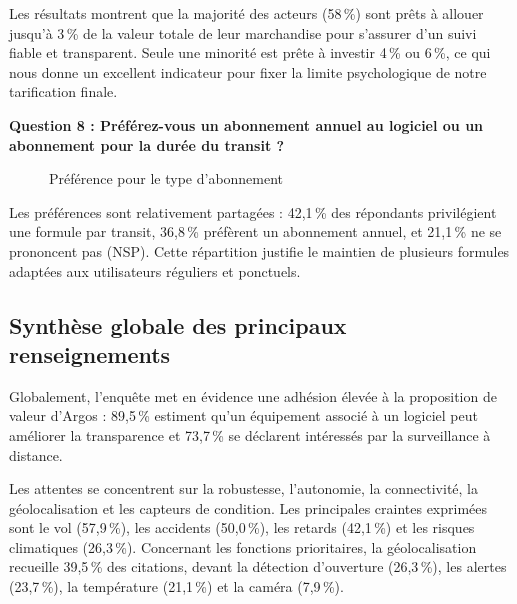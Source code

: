 Les résultats montrent que la majorité des acteurs (58\,\%) sont prêts à allouer jusqu'à 3\,\% de la valeur totale de leur marchandise pour s'assurer d'un suivi fiable et transparent. Seule une minorité est prête à investir 4\,\% ou 6\,\%, ce qui nous donne un excellent indicateur pour fixer la limite psychologique de notre tarification finale.

\textbf{Question 8 : Préférez-vous un abonnement annuel au logiciel ou un abonnement pour la durée du transit ?}

\begin{figure}[H]
	\centering
	\caption{Préférence pour le type d’abonnement}
	\label{fig:abonnement}
    \tablesourcepromoteurs

\end{figure}

Les préférences sont relativement partagées : 42,1\,\% des répondants privilégient une formule par transit, 36,8\,\% préfèrent un abonnement annuel, et 21,1\,\% ne se prononcent pas (NSP). Cette répartition justifie le maintien de plusieurs formules adaptées aux utilisateurs réguliers et ponctuels.

\subsection{Synthèse globale des principaux renseignements}

Globalement, l’enquête met en évidence une adhésion élevée à la proposition de valeur d’Argos : 89,5\,\% estiment qu’un équipement associé à un logiciel peut améliorer la transparence et 73,7\,\% se déclarent intéressés par la surveillance à distance.

Les attentes se concentrent sur la robustesse, l’autonomie, la connectivité, la géolocalisation et les capteurs de condition. Les principales craintes exprimées sont le vol (57,9\,\%), les accidents (50,0\,\%), les retards (42,1\,\%) et les risques climatiques (26,3\,\%). Concernant les fonctions prioritaires, la géolocalisation recueille 39,5\,\% des citations, devant la détection d’ouverture (26,3\,\%), les alertes (23,7\,\%), la température (21,1\,\%) et la caméra (7,9\,\%).

